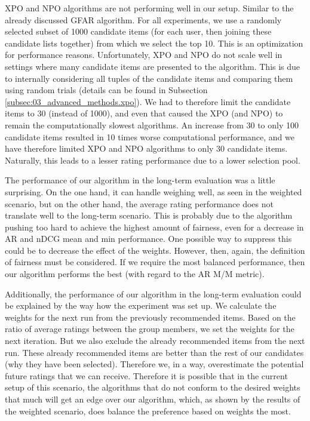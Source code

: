 XPO and NPO algorithms are not performing well in our setup. Similar to the already discussed GFAR algorithm. For all experiments, we use a randomly selected subset of 1000 candidate items (for each user, then joining these candidate lists together) from which we select the top 10. This is an optimization for performance reasons. Unfortunately, XPO and NPO do not scale well in settings where many candidate items are presented to the algorithm. This is due to internally considering all tuples of the candidate items and comparing them using random trials (details can be found in Subsection \ref{subsec:03_advanced_methods.xpo}). We had to therefore limit the candidate items to 30 (instead of 1000), and even that caused the XPO (and NPO) to remain the computationally slowest algorithms. An increase from 30 to only 100 candidate items resulted in 10 times worse computational performance, and we have therefore limited XPO and NPO algorithms to only 30 candidate items. Naturally, this leads to a lesser rating performance due to a lower selection pool.

The performance of our algorithm in the long-term evaluation was a little surprising. On the one hand, it can handle weighing well, as seen in the weighted scenario, but on the other hand, the average rating performance does not translate well to the long-term scenario. This is probably due to the algorithm pushing too hard to achieve the highest amount of fairness, even for a decrease in AR and nDCG mean and min performance. One possible way to suppress this could be to decrease the effect of the weights. However, then, again, the definition of fairness must be considered. If we require the most balanced performance, then our algorithm performs the best (with regard to the AR M/M metric).

Additionally, the performance of our algorithm in the long-term evaluation could be explained by the way how the experiment was set up. We calculate the weights for the next run from the previously recommended items. Based on the ratio of average ratings between the group members, we set the weights for the next iteration. But we also exclude the already recommended items from the next run. These already recommended items are better than the rest of our candidates (why they have been selected). Therefore we, in a way, overestimate the potential future ratings that we can receive. Therefore it is possible that in the current setup of this scenario, the algorithms that do not conform to the desired weights that much will get an edge over our algorithm, which, as shown by the results of the weighted scenario, does balance the preference based on weights the most.

